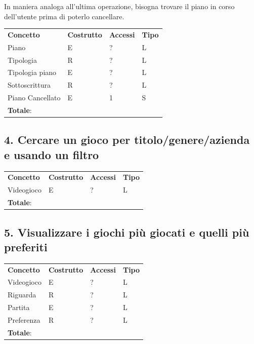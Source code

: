 \documentclass[a4paper,12pt]{report}
\begin{document}
In maniera analoga all'ultima operazione, bisogna trovare il piano in corso dell'utente prima di poterlo cancellare.

\begin{table}[!htb]
\begin{center}
	\begin{tabular}{ | m{5cm} P{4cm} P{4cm} P{4cm} | }
	 \textbf{Concetto} & \textbf{Costrutto} & \textbf{Accessi} & \textbf{Tipo} \\
	Piano    		 & E & ? & L \\ \hline
	Tipologia		 & R & ? & L \\ \hline
	Tipologia piano  & E & ? & L \\ \hline
	Sottoscrittura   & R & ? & L \\ \hline
	Piano Cancellato & E & 1 & S \\ \hline
	 \textbf{Totale}: & & & \\ \hline
	\end{tabular}
\end{center}
\end{table}


\subsection*{4. Cercare un gioco per titolo/genere/azienda e usando un filtro}

\begin{table}[h!]
\begin{center}
	\begin{tabular}{ | m{4cm} P{4cm} P{4cm} P{4cm} | }
	 \textbf{Concetto} & \textbf{Costrutto} & \textbf{Accessi} & \textbf{Tipo} \\
	Videogioco       & E & ? & L \\ \hline
	 \textbf{Totale}: & & & \\ \hline
	\end{tabular}
\end{center}
\end{table}

\subsection*{5. Visualizzare i giochi più giocati e quelli più preferiti}

\begin{table}[h!]
\begin{center}
	\begin{tabular}{ | m{4cm} P{4cm} P{4cm} P{4cm} | }
	 \textbf{Concetto} & \textbf{Costrutto} & \textbf{Accessi} & \textbf{Tipo} \\
	Videogioco & E & ? & L \\ \hline
	Riguarda	   & R & ? & L \\ \hline
	Partita    & E & ? & L \\ \hline
	Preferenza & R & ? & L \\ \hline
	 \textbf{Totale}: & & & \\ \hline
	\end{tabular}
\end{center}
\end{table}
\end{document}
